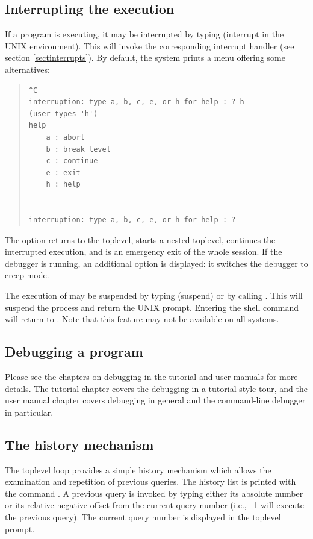 \subsection{Interrupting the execution}

If a program is executing, it may be interrupted by
typing  (interrupt in the UNIX environment).
This will invoke the corresponding interrupt handler
(see section \ref{sectinterrupts}).
By default, the system prints a menu offering some alternatives:
\begin{quote}
\begin{verbatim}
^C
interruption: type a, b, c, e, or h for help : ? h            (user types 'h')
help
	a : abort
	b : break level
	c : continue
	e : exit
	h : help


interruption: type a, b, c, e, or h for help : ?
\end{verbatim}
\end{quote}
The  option returns to the toplevel,  starts a nested
toplevel,
 continues the interrupted execution, and  is an
emergency
exit
of the whole {\eclipse} session. If the debugger is running, an additional
option  is displayed: it switches the debugger to creep mode.

The execution of {\eclipse} may be suspended by typing 
(suspend) or by calling .
This will suspend the {\eclipse} process and return the UNIX prompt.
Entering the shell command  will return to {\eclipse}.
Note that this feature may not be available on all systems.

\subsection{Debugging a program}

Please see the chapters on debugging in the tutorial and user manuals for
more details. The tutorial chapter covers the {\tkeclipse} debugging in a
tutorial style tour, and the user manual chapter covers
 debugging in
general and the command-line debugger in particular.

\subsection{The history mechanism}
The {\eclipse} toplevel loop provides a simple history mechanism which allows
the examination and repetition of previous queries.
The history list is printed with the command .
A previous query is invoked by typing either its absolute number or its
relative negative offset from the current query number (i.e., --1 will
execute the previous query).
The current query number is displayed in the toplevel prompt.

